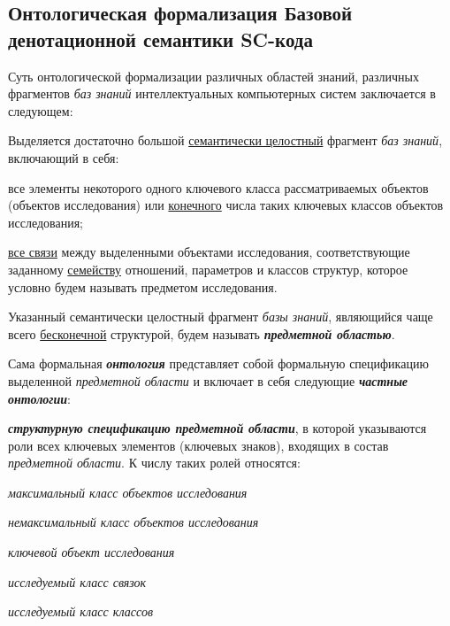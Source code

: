 \newpage
\subsection{Онтологическая формализация Базовой денотационной семантики SC-кода}

Суть онтологической формализации различных областей знаний, различных фрагментов \textit{баз знаний} интеллектуальных компьютерных систем заключается в следующем:
\begin{textitemize}
	\item Выделяется достаточно большой \underline{семантически целостный} фрагмент \textit{баз знаний}, включающий в себя:
	\begin{textitemize}
		\item все элементы некоторого одного ключевого класса рассматриваемых объектов (объектов исследования) или \underline{конечного} числа таких ключевых классов объектов исследования;
		\item \underline{все связи} между выделенными объектами исследования, соответствующие заданному \underline{семейству} отношений, параметров и классов структур, которое условно будем называть предметом исследования. 
	\end{textitemize}
	\item Указанный семантически целостный фрагмент \textit{базы знаний}, являющийся чаще всего \underline{бесконечной} структурой, будем называть \textbf{\textit{предметной областью}}.
	\item Сама формальная \textbf{\textit{онтология}} представляет собой формальную спецификацию выделенной \textit{предметной области} и включает в себя следующие \textbf{\textit{частные онтологии}}:
	 \begin{textitemize}
	 	\item \textbf{\textit{структурную спецификацию предметной области}}, в которой указываются роли всех ключевых элементов (ключевых знаков), входящих в состав \textit{предметной области}. К числу таких ролей относятся:
	 	\begin{textitemize}
	 		\item \textit{максимальный класс объектов исследования\scnrolesign}
	 		\item \textit{немаксимальный класс объектов исследования\scnrolesign}
	 		\item \textit{ключевой объект исследования\scnrolesign}
	 		\item \textit{исследуемый класс связок\scnrolesign}
	 		\item \textit{исследуемый класс классов\scnrolesign}

\end{textitemize}
\end{textitemize}
\end{textitemize}
